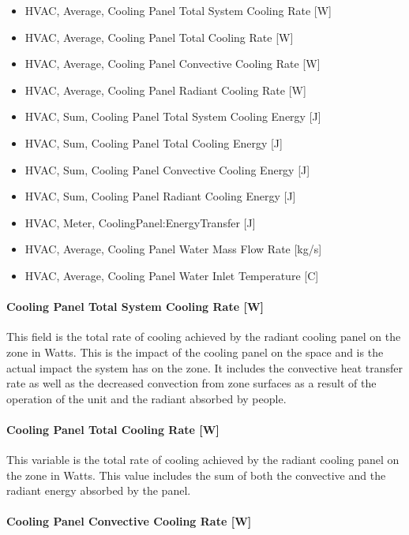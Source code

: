 \begin{itemize}
\item
  HVAC, Average, Cooling Panel Total System Cooling Rate [W]
\item
  HVAC, Average, Cooling Panel Total Cooling Rate [W]
\item
  HVAC, Average, Cooling Panel Convective Cooling Rate [W]
\item
  HVAC, Average, Cooling Panel Radiant Cooling Rate [W]
\item
  HVAC, Sum, Cooling Panel Total System Cooling Energy [J]
\item
  HVAC, Sum, Cooling Panel Total Cooling Energy [J]
\item
  HVAC, Sum, Cooling Panel Convective Cooling Energy [J]
\item
  HVAC, Sum, Cooling Panel Radiant Cooling Energy [J]
\item
  HVAC, Meter, CoolingPanel:EnergyTransfer [J]
\item
  HVAC, Average, Cooling Panel Water Mass Flow Rate [kg/s]
\item
  HVAC, Average, Cooling Panel Water Inlet Temperature [C]
\end{itemize}

\paragraph{Cooling Panel Total System Cooling Rate [W]}\label{cooling-panel-total-system-cooling-rate-w}

This field is the total rate of cooling achieved by the radiant cooling panel on the zone in Watts. This is the impact of the cooling panel on the space and is the actual impact the system has on the zone.  It includes the convective heat transfer rate as well as the decreased convection from zone surfaces as a result of the operation of the unit and the radiant absorbed by people.

\paragraph{Cooling Panel Total Cooling Rate [W]}\label{cooling-panel-total-cooling-rate-w}

This variable is the total rate of cooling achieved by the radiant cooling panel on the zone in Watts. This value includes the sum of both the convective and the radiant energy absorbed by the panel.

\paragraph{Cooling Panel Convective Cooling Rate [W]}\label{cooling-panel-convective-cooling-rate-w}

